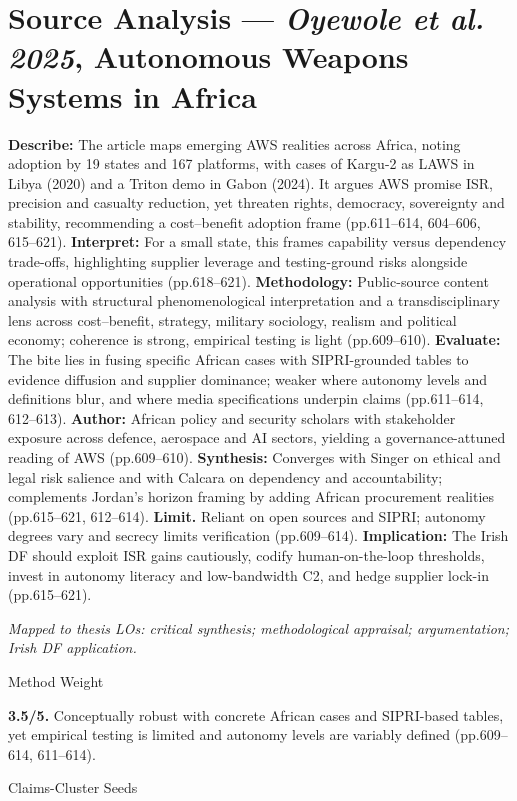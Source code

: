 \section*{Source Analysis — \textit{Oyewole et al. 2025}, Autonomous Weapons Systems in Africa}
\textbf{Describe:} The article maps emerging AWS realities across Africa, noting adoption by 19 states and 167 platforms, with cases of Kargu-2 as LAWS in Libya (2020) and a Triton demo in Gabon (2024). It argues AWS promise ISR, precision and casualty reduction, yet threaten rights, democracy, sovereignty and stability, recommending a cost–benefit adoption frame (pp.611–614, 604–606, 615–621).
\textbf{Interpret:} For a small state, this frames capability versus dependency trade-offs, highlighting supplier leverage and testing-ground risks alongside operational opportunities (pp.618–621).
\textbf{Methodology:} Public-source content analysis with structural phenomenological interpretation and a transdisciplinary lens across cost–benefit, strategy, military sociology, realism and political economy; coherence is strong, empirical testing is light (pp.609–610).
\textbf{Evaluate:} The bite lies in fusing specific African cases with SIPRI-grounded tables to evidence diffusion and supplier dominance; weaker where autonomy levels and definitions blur, and where media specifications underpin claims (pp.611–614, 612–613).
\textbf{Author:} African policy and security scholars with stakeholder exposure across defence, aerospace and AI sectors, yielding a governance-attuned reading of AWS (pp.609–610).
\textbf{Synthesis:} Converges with Singer on ethical and legal risk salience and with Calcara on dependency and accountability; complements Jordan’s horizon framing by adding African procurement realities (pp.615–621, 612–614).
\textbf{Limit.} Reliant on open sources and SIPRI; autonomy degrees vary and secrecy limits verification (pp.609–614). \textbf{Implication:} The Irish DF should exploit ISR gains cautiously, codify human-on-the-loop thresholds, invest in autonomy literacy and low-bandwidth C2, and hedge supplier lock-in (pp.615–621).

\textit{Mapped to thesis LOs: critical synthesis; methodological appraisal; argumentation; Irish DF application.}

Method Weight

\textbf{3.5/5.} Conceptually robust with concrete African cases and SIPRI-based tables, yet empirical testing is limited and autonomy levels are variably defined (pp.609–614, 611–614).

Claims-Cluster Seeds

